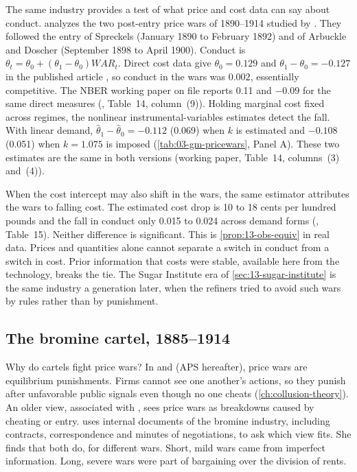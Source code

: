 The same industry provides a test of what price and cost data can say about conduct. 
analyzes the two post-entry price wars of 1890--1914 studied by \citet{GenesoveMullin1998}. They followed the
entry of Spreckels (January 1890 to February 1892) and of Arbuckle and Doscher (September 1898 to April 1900).
Conduct is $\theta_t = \theta_0 + (\theta_1 - \theta_0)\mathit{WAR}_t$. Direct cost data give
$\theta_0 = 0.129$ and $\theta_1 - \theta_0 = -0.127$ in the published article \citep[Table~10]{GenesoveMullin1998},
so conduct in the wars
was $0.002$, essentially competitive. The NBER working paper on file reports 0.11 and $-0.09$ for the same direct
measures (\citealp{GenesoveMullin1995}, Table~14, column~(9)). Holding marginal cost fixed across regimes, the
nonlinear instrumental-variables estimates detect the fall. With linear demand, $\hat\theta_1 - \hat\theta_0 =
-0.112$ (0.069) when $k$ is estimated and $-0.108$ (0.051) when $k = 1.075$ is imposed (\cref{tab:03-gm-pricewars},
Panel A). These two estimates are the same in both versions (working paper, Table~14, columns~(3) and~(4)).

When the cost intercept may also shift in the wars, the same estimator attributes the wars to falling cost. The
estimated cost drop is 10 to 18 cents per hundred pounds and the fall in conduct only 0.015 to 0.024 across
demand forms (\citealp{GenesoveMullin1995}, Table~15). Neither difference is significant. This is
\cref{prop:13-obs-equiv} in real data. Prices and quantities alone cannot separate a switch in conduct from a
switch in cost. Prior information that costs were stable, available here from the technology, breaks the tie.
The Sugar Institute era of \cref{sec:13-sugar-institute} is the same industry a generation later, when the
refiners tried to avoid such wars by rules rather than by punishment.

\subsection{The bromine cartel, 1885--1914}\label{sec:13-bromine}

Why do cartels fight price wars? In \citet{GreenPorter1984} and \citet{AbreuPearceStacchetti1986} (APS
hereafter), price wars are equilibrium punishments. Firms cannot see one another's actions, so they punish after
unfavorable public signals even though no one cheats (\cref{ch:collusion-theory}). An older view, associated with
\citet{Stigler1964}, sees price wars as breakdowns caused by cheating or entry. \citet{Levenstein1997} uses
internal documents of the bromine industry, including contracts, correspondence and minutes of negotiations, to
ask which view fits. She finds that both do, for different wars. Short, mild wars came from imperfect
information. Long, severe wars were part of bargaining over the division of rents.

